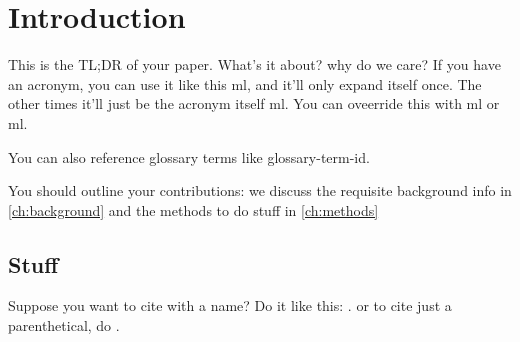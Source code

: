\chapter{Introduction}\label{ch:introduction}
This is the TL;DR of your paper. What's it about? why do we care?
If you have an acronym, you can use it like this \gls{ml}, and it'll only
expand itself once. The other times it'll just be the acronym itself \gls{ml}.
You can oveerride this with \acrfull{ml} or \acrlong{ml}.

You can also reference glossary terms like \gls{glossary-term-id}.

You should outline your contributions: we discuss the requisite background info in \cref{ch:background}
and the methods to do stuff in \cref{ch:methods}

\section{Stuff}

Suppose you want to cite with a name? Do it like this: \citet{russellArtificialIntelligenceModern2010}.
or to cite just a parenthetical, do \citep{russellArtificialIntelligenceModern2010}.
